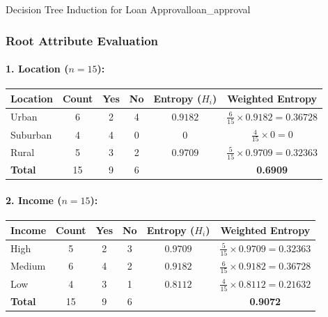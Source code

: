 \begin{example}{Decision Tree Induction for Loan Approval}{loan_approval}
\subsubsection{Root Attribute Evaluation}

\paragraph{1. Location ($n = 15$):}
\begin{center}\renewcommand{\arraystretch}{1.35}
\begin{tabular}{lccccc}
\toprule
\textbf{Location} & \textbf{Count} & \textbf{Yes} & \textbf{No} & \textbf{Entropy ($H_i$)} & \textbf{Weighted Entropy} \\
\midrule
Urban    & 6 & 2 & 4 & $0.9182$ & $\frac{6}{15} \times 0.9182 = 0.36728$ \\
Suburban & 4 & 4 & 0 & $0$ & $\frac{4}{15} \times 0 = 0$ \\
Rural    & 5 & 3 & 2 & $0.9709$ & $\frac{5}{15} \times 0.9709 = 0.32363$ \\
\midrule
\textbf{Total} & 15 & 9 & 6 & & \textbf{0.6909} \\
\bottomrule
\end{tabular}
\end{center}

\paragraph{2. Income ($n = 15$):}
\begin{center}\renewcommand{\arraystretch}{1.35}
\begin{tabular}{lccccc}
\toprule
\textbf{Income} & \textbf{Count} & \textbf{Yes} & \textbf{No} & \textbf{Entropy ($H_i$)} & \textbf{Weighted Entropy} \\
\midrule
High   & 5 & 2 & 3 & $0.9709$ & $\frac{5}{15} \times 0.9709 = 0.32363$ \\
Medium & 6 & 4 & 2 & $0.9182$ & $\frac{6}{15} \times 0.9182 = 0.36728$ \\
Low    & 4 & 3 & 1 & $0.8112$ & $\frac{4}{15} \times 0.8112 = 0.21632$ \\
\midrule
\textbf{Total} & 15 & 9 & 6 & & \textbf{0.9072} \\
\bottomrule
\end{tabular}
\end{center}


\end{example}
